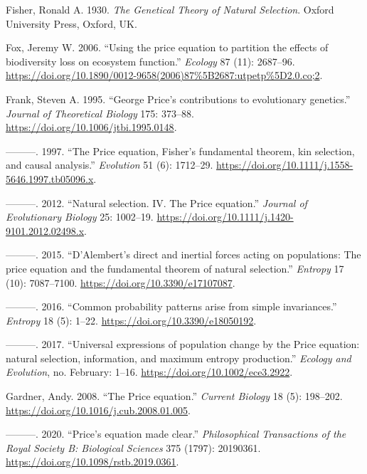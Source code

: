 \documentclass[
]{article}
\newlength{\cslhangindent}
\newlength{\cslentryspacingunit} %
\newenvironment{CSLReferences}[2] %
 {%
  \setlength{\parindent}{0pt}
  \ifodd #1
  \let\oldpar\par
  \def\par{\hangindent=\cslhangindent\oldpar}
  \fi
  \setlength{\parskip}{#2\cslentryspacingunit}
 }%
 {}
\begin{document}
\begin{CSLReferences}{1}{0}
\leavevmode{}%
Fisher, Ronald A. 1930. \emph{The Genetical Theory of Natural
Selection}. Oxford University Press, Oxford, UK.

\leavevmode{}%
Fox, Jeremy W. 2006. {``{Using the price equation to partition the
effects of biodiversity loss on ecosystem function}.''} \emph{Ecology}
87 (11): 2687--96.
\url{https://doi.org/10.1890/0012-9658(2006)87\%5B2687:utpetp\%5D2.0.co;2}.

\leavevmode{}%
Frank, Steven A. 1995. {``{George Price's contributions to evolutionary
genetics}.''} \emph{Journal of Theoretical Biology} 175: 373--88.
\url{https://doi.org/10.1006/jtbi.1995.0148}.

\leavevmode{}%
---------. 1997. {``{The Price equation, Fisher's fundamental theorem,
kin selection, and causal analysis}.''} \emph{Evolution} 51 (6):
1712--29. \url{https://doi.org/10.1111/j.1558-5646.1997.tb05096.x}.

\leavevmode{}%
---------. 2012. {``{Natural selection. IV. The Price equation}.''}
\emph{Journal of Evolutionary Biology} 25: 1002--19.
\url{https://doi.org/10.1111/j.1420-9101.2012.02498.x}.

\leavevmode{}%
---------. 2015. {``{D'Alembert's direct and inertial forces acting on
populations: The price equation and the fundamental theorem of natural
selection}.''} \emph{Entropy} 17 (10): 7087--7100.
\url{https://doi.org/10.3390/e17107087}.

\leavevmode{}%
---------. 2016. {``{Common probability patterns arise from simple
invariances}.''} \emph{Entropy} 18 (5): 1--22.
\url{https://doi.org/10.3390/e18050192}.

\leavevmode{}%
---------. 2017. {``{Universal expressions of population change by the
Price equation: natural selection, information, and maximum entropy
production}.''} \emph{Ecology and Evolution}, no. February: 1--16.
\url{https://doi.org/10.1002/ece3.2922}.

\leavevmode{}%
Gardner, Andy. 2008. {``{The Price equation}.''} \emph{Current Biology}
18 (5): 198--202. \url{https://doi.org/10.1016/j.cub.2008.01.005}.

\leavevmode{}%
---------. 2020. {``{Price's equation made clear}.''}
\emph{Philosophical Transactions of the Royal Society B: Biological
Sciences} 375 (1797): 20190361.
\url{https://doi.org/10.1098/rstb.2019.0361}.


\end{CSLReferences}
\end{document}
